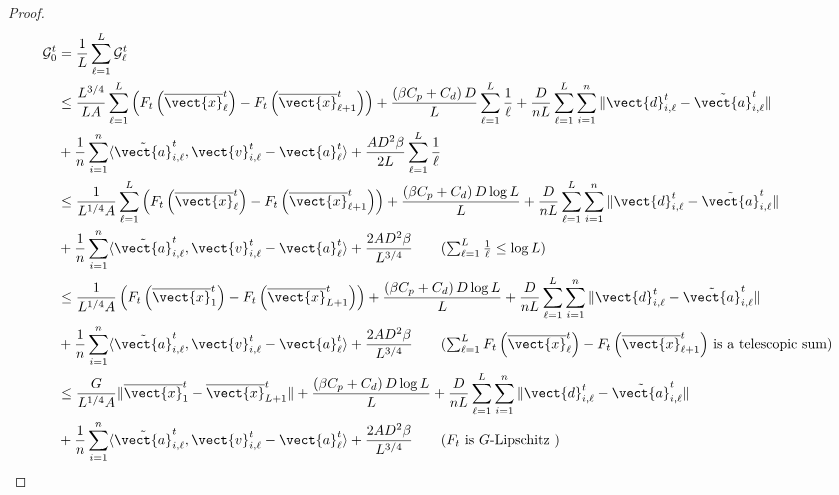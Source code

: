 \begin{proof}
\begin{align*}
        \mathcal{G}^t_{0}
        &= \frac{1}{L} \sum_{\ell=1}^{L}\mathcal{G}^{t}_{\ell}\\
        & \leq \frac{L^{3/4}}{LA} \sum_{\ell=1}^{L} \left(F_t \left( \overline{\vect{x}}^t_{\ell} \right) - F_t \left( \overline{\vect{x}}^t_{\ell+1} \right) \right) + \frac{\left(\beta C_p + C_d\right)D}{L} \sum_{\ell =1}^{L} \frac{1}{\ell} + \frac{D}{nL} \sum_{\ell=1}^{L} \sum_{i=1}^{n} \| \vect{d}^t_{i,\ell} - \Tilde{\vect{a}}^{t}_{i, \ell} \|\\
        &+ \frac{1}{n}\sum_{i=1}^{n}\langle \Tilde{\vect{a}}^{t}_{i, \ell}, \vect{v}^t_{i,\ell} - \vect{a}^{t}_{\ell} \rangle + \frac{AD^2\beta}{2L} \sum_{\ell =1}^{L} \frac{1}{\ell}\\
        &\leq \frac{1}{L^{1/4}A} \sum_{\ell=1}^{L} \left(F_t \left( \overline{\vect{x}}^t_{\ell} \right) - F_t \left( \overline{\vect{x}}^t_{\ell+1} \right) \right) + \frac{\left(\beta C_p + C_d\right)D \log L }{L} + \frac{D}{nL} \sum_{\ell=1}^{L} \sum_{i=1}^{n} \| \vect{d}^t_{i,\ell} - \Tilde{\vect{a}}^{t}_{i, \ell} \| \\
        &+ \frac{1}{n}\sum_{i=1}^{n}\langle \Tilde{\vect{a}}^{t}_{i, \ell}, \vect{v}^t_{i,\ell} - \vect{a}^{t}_{\ell} \rangle + \frac{2AD^2\beta}{L^{3/4}}  \tag{$\sum_{\ell =1}^{L} \frac{1}{\ell} \leq \log L $}\\
         &\leq \frac{1}{L^{1/4}A} \left(F_t \left( \overline{\vect{x}}^t_{1} \right) - F_t \left( \overline{\vect{x}}^t_{L+1} \right) \right) + \frac{\left(\beta C_p + C_d\right)D \log L }{L} + \frac{D}{nL} \sum_{\ell=1}^{L} \sum_{i=1}^{n} \| \vect{d}^t_{i,\ell} - \Tilde{\vect{a}}^{t}_{i, \ell} \| \\
         &+ \frac{1}{n}\sum_{i=1}^{n}\langle \Tilde{\vect{a}}^{t}_{i, \ell}, \vect{v}^t_{i,\ell} - \vect{a}^{t}_{\ell} \rangle + \frac{2AD^2\beta}{L^{3/4}}
         \tag{$\sum_{\ell=1}^{L} F_t\left(\overline{\vect{x}}^t_{\ell} \right) - F_t \left( \overline{\vect{x}}^t_{\ell+1}\right)$ is a telescopic sum}\\
        &\leq \frac{G}{L^{1/4}A} \| \overline{\vect{x}}^t_{1} - \overline{\vect{x}}^t_{L+1} \| + \frac{\left(\beta C_p + C_d\right)D \log L }{L} + \frac{D}{nL} \sum_{\ell=1}^{L} \sum_{i=1}^{n} \| \vect{d}^t_{i,\ell} - \Tilde{\vect{a}}^{t}_{i, \ell} \| \\
        &+ \frac{1}{n}\sum_{i=1}^{n}\langle \Tilde{\vect{a}}^{t}_{i, \ell}, \vect{v}^t_{i,\ell} - \vect{a}^{t}_{\ell} \rangle + \frac{2AD^2\beta}{L^{3/4}}
        \tag{$F_t$ is $G$-Lipschitz }\\

\end{align*}
\end{proof}

